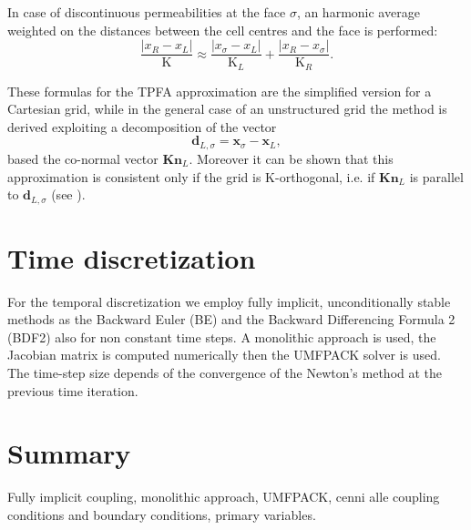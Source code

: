 In case of discontinuous permeabilities at the face $\sigma$, an harmonic 
average weighted on the distances between the cell centres and the face is 
performed:
\begin{equation}
\frac{|x_R - x_L|}{\mathrm{K}} \approx 
\frac{|x_\sigma - x_L|}{\mathrm{K}_L}+\frac{|x_R - x_\sigma|}{\mathrm{K}_R}.
\end{equation}

These formulas for the TPFA approximation are the simplified version for a 
Cartesian grid, while in the general case of an unstructured grid the method is 
derived exploiting a decomposition of the vector
\begin{equation}
\mathbf{d}_{L,\sigma}=\mathbf{x}_\sigma - \mathbf{x}_L,
\end{equation}
based the co-normal vector $\mathbf{Kn}_L$. Moreover it 
can be shown that this approximation is consistent only if the grid is 
K-orthogonal, i.e. if $\mathbf{Kn}_L$ is parallel to $\mathbf{d}_{L, \sigma}$ 
(see \cite{tesi:wolff}).
\section{Time discretization} \label{subsec:time}
For the temporal discretization we employ fully implicit, unconditionally 
stable methods as the Backward Euler (BE) and the Backward Differencing Formula 
2 (BDF2) also for non constant time steps. A monolithic approach is used, the 
Jacobian matrix is computed 
numerically then the UMFPACK solver is used. The time-step size depends of the 
convergence of the Newton's method at the previous time iteration.
\section{Summary}
Fully implicit coupling, monolithic approach, UMFPACK, cenni alle coupling 
conditions and boundary conditions, primary variables.